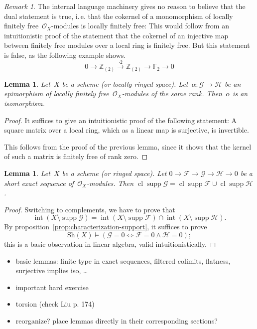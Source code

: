 \documentclass[10pt]{amsart}
\makeatletter
\theoremstyle{definition}
\theoremstyle{plain}
\newtheorem{lemma}[defn]{Lemma}
\theoremstyle{remark}
\newtheorem{rem}[defn]{Remark}
\newcommand{\ZZ}{\mathbb{Z}}
\newcommand{\FF}{\mathbb{F}}
\newcommand{\F}{\mathcal{F}}
\newcommand{\G}{\mathcal{G}}
\renewcommand{\H}{\mathcal{H}}
\renewcommand{\O}{\mathcal{O}}
\newcommand{\Sh}{\mathrm{Sh}}
\DeclareMathOperator{\Int}{int}
\DeclareMathOperator{\Clos}{cl}
\DeclareMathOperator{\supp}{supp}
\newcommand{\?}{\,{:}\,}
\renewcommand{\_}{\mathpunct{.}\,}
\newcommand{\lra}{\longrightarrow}
\newcommand{\ie}{i.\,e.\@\xspace}
\makeatother
\begin{document}
\begin{rem}The internal language machinery gives no reason to believe that the
dual statement is true, \ie that the cokernel of a monomorphism of locally
finitely free~$\O_X$-modules is locally finitely free: This would follow from
an intuitionistic proof of the statement that the cokernel of an injective map
between finitely free modules over a local ring is finitely free. But this
statement is false, as the following example shows.
\[ 0 \lra \ZZ_{(2)} \stackrel{\cdot 2}{\lra} \ZZ_{(2)} \lra \FF_2 \lra 0 \]
\end{rem}

\begin{lemma}Let~$X$ be a scheme (or locally ringed space). Let~$\alpha : \G
\to \H$ be an epimorphism of locally finitely free~$\O_X$-modules of the same
rank. Then~$\alpha$ is an isomorphism.\end{lemma}
\begin{proof}It suffices to give an intuitionistic proof of the following
statement: A square matrix over a local ring, which as a linear map is
surjective, is invertible.

This follows from the proof of the previous lemma, since it shows that the
kernel of such a matrix is finitely free of rank zero.
\end{proof}

\begin{lemma}Let~$X$ be a scheme (or ringed space). Let
$0 \to \F \to \G \to \H \to 0$ be a short exact sequence of~$\O_X$-modules.
Then
$\Clos \supp \G = \Clos \supp \F \cup \Clos \supp \H$.
\end{lemma}
\begin{proof}Switching to complements, we have to prove that
\[ \Int(X \setminus \supp\G) = \Int(X \setminus \supp\F) \cap \Int(X \setminus
\supp\H). \]
By proposition~\ref{prop:characterization-support}, it suffices to prove
\[ \Sh(X) \models (\G = 0 \Longleftrightarrow \F = 0 \wedge \H = 0); \]
this is a basic observation in linear algebra, valid intuitionistically.
\end{proof}


\begin{itemize}
\item basic lemmas: finite type in exact sequences, filtered colimits,
flatness, surjective implies iso, \ldots
\item important hard exercise
\item torsion (check Liu p. 174)
\item reorganize? place lemmas directly in their corresponding sections?
\end{itemize}
\end{document}
